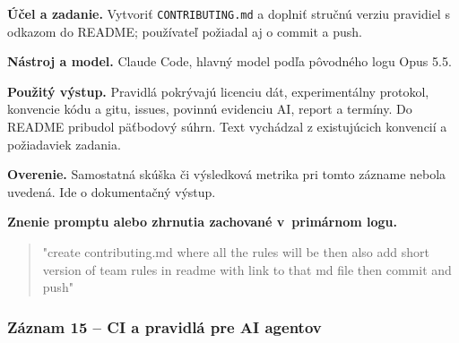 \par\noindent \textbf{Účel a zadanie.} Vytvoriť \texttt{CONTRIBUTING\allowbreak{}.\allowbreak{}md} a doplniť stručnú verziu pravidiel s odkazom do README; používateľ požiadal aj o commit a push.\par\smallskip
\par\noindent \textbf{Nástroj a model.} Claude Code, hlavný model podľa pôvodného logu Opus 5.5.\par\smallskip
\par\noindent \textbf{Použitý výstup.} Pravidlá pokrývajú licenciu dát, experimentálny protokol, konvencie kódu a gitu, issues, povinnú evidenciu AI, report a termíny. Do README pribudol päťbodový súhrn. Text vychádzal z existujúcich konvencií a požiadaviek zadania.\par\smallskip
\par\noindent \textbf{Overenie.} Samostatná skúška či výsledková metrika pri tomto zázname nebola uvedená. Ide o dokumentačný výstup.\par\smallskip

\par\noindent\textbf{Znenie promptu alebo zhrnutia zachované v~primárnom logu.}

\begin{quote}\normalsize "create contributing.md where all the rules will be then also add short version of team rules in readme with link to that md file then commit and push"\end{quote}

\subsubsection*{Záznam 15 -- CI a pravidlá pre AI agentov}



